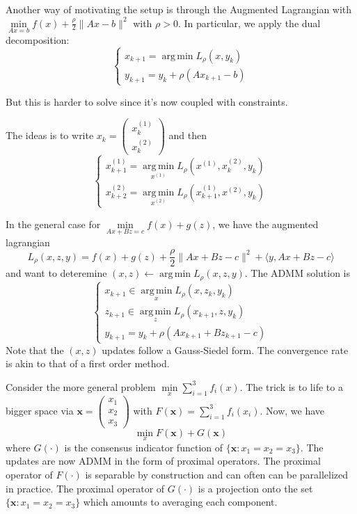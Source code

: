\documentclass[english, 11pt]{article}
\DeclareMathOperator*{\argmin}{arg\,min}
\begin{document}
 
 Another way of motivating the setup is through the Augmented Lagrangian with $\min \limits_{Ax=b} f(x) + \frac{\rho}{2} \|Ax-b\|^2$ with $\rho>0$. In particular, we apply the dual decomposition:
 \[
 \begin{cases}
 x_{k+1} = \argmin L_\rho(x,y_k) \\
 y_{k+1} = y_k + \rho (Ax_{k+1} - b)
 \end{cases}
 \]

 But this is harder to solve since it's now coupled with constraints.
 
 The ideas is to write $x_k = \begin{pmatrix} x_k^{(1)} \\ x_k^{(2)} \end{pmatrix}$ and then
 \[
 \begin{cases}
 x_{k+1}^{(1)} = \argmin \limits_{x^{(1)}} L_\rho (x^{(1)}, x^{(2)}_k, y_k) \\
 x_{k+2}^{(2)} = \argmin \limits_{x^{(2)}} L_\rho (x^{(1)}_{k+1}, x^{(2)},  y_k)
 \end{cases}
 \]
 
 In the general case for $\min \limits_{Ax+Bz=c} f(x) + g(z)$, we have
  the augmented lagrangian
   \[
 L_\rho(x,z,y) = f(x) + g(z) + \frac{\rho}{2} \|Ax+Bz-c\|^2 + \langle y, Ax + Bz - c \rangle
 \]
 and want to deteremine $(x,z) \leftarrow \argmin L_\rho(x,z,y)$. The ADMM solution is 
 \[
 \begin{cases}
 x_{k+1} \in \argmin \limits_x L_\rho(x,z_k,y_k) \\
 z_{k+1} \in \argmin \limits_z L_\rho(x_{k+1},z,y_k) \\
 y_{k+1} = y_k + \rho(Ax_{k+1} + Bz_{k+1} -c )
 \end{cases}
 \]
 Note that the $(x,z)$ updates follow a Gauss-Siedel form. The convergence rate is akin to that of a first order method.
 
 \begin{rem}
Consider the more general problem $\min \limits_x \sum_{i=1}^3 f_i(x)$. The trick is to life to a bigger space via $\mathbf{x} = \begin{pmatrix} x_1 \\ x_2 \\ x_3 \end{pmatrix}$ with $F(\mathbf{x}) = \sum_{i=1}^3 f_i(x_i)$. Now, we have
\[
\min \limits_x F(\mathbf{x}) + G(\mathbf{x})
\]
where $G(\cdot)$ is the consensus indicator function of $\{ \mathbf{x} : x_1 =x_2 = x_3 \}$. The updates are now ADMM in the form of proximal operators. The proximal operator of $F(\cdot)$ is separable by construction and can often can be parallelized in practice. The proximal operator of $G(\cdot)$ is a projection onto the set $\{ \mathbf{x} : x_1 =x_2 = x_3 \}$ which amounts to averaging each component.
 \end{rem}
 
\end{document}
